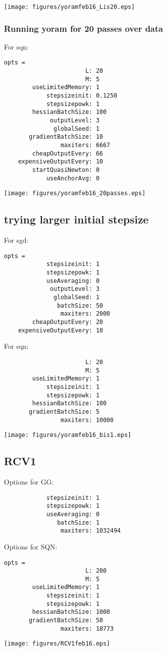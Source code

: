 \documentclass{article}
\begin{document}
\texttt{[image: figures/yoramfeb16\_Lis20.eps]} 

\subsubsection{Running yoram for 20 passes over data}
For sqn:
\begin{verbatim}
opts = 
                       L: 20
                       M: 5
        useLimitedMemory: 1
            stepsizeinit: 0.1250
            stepsizepowk: 1
        hessianBatchSize: 100
             outputLevel: 3
              globalSeed: 1
       gradientBatchSize: 10
                maxiters: 6667
        cheapOutputEvery: 66
    expensiveOutputEvery: 10
        startQuasiNewton: 0
            useAnchorAvg: 0
\end{verbatim}
\texttt{[image: figures/yoramfeb16\_20passes.eps]}


\subsection{trying larger initial stepsize}
For sgd:
\begin{verbatim}
opts = 
            stepsizeinit: 1
            stepsizepowk: 1
            useAveraging: 0
             outputLevel: 3
              globalSeed: 1
               batchSize: 50
                maxiters: 2000
        cheapOutputEvery: 20
    expensiveOutputEvery: 10
\end{verbatim}
For sqn:
\begin{verbatim}
                       L: 20
                       M: 5
        useLimitedMemory: 1
            stepsizeinit: 1
            stepsizepowk: 1
        hessianBatchSize: 100
       gradientBatchSize: 5
                maxiters: 10000
\end{verbatim}
\texttt{[image: figures/yoramfeb16\_bis1.eps]} 

\subsection{RCV1}
Options for GG:
\begin{verbatim}
            stepsizeinit: 1
            stepsizepowk: 1
            useAveraging: 0
               batchSize: 1
                maxiters: 1032494
\end{verbatim}
Options for SQN:
\begin{verbatim}
opts = 
                       L: 200
                       M: 5
        useLimitedMemory: 1
            stepsizeinit: 1
            stepsizepowk: 1
        hessianBatchSize: 1000
       gradientBatchSize: 50
                maxiters: 18773
\end{verbatim}
\texttt{[image: figures/RCV1feb16.eps]} 
\end{document}
